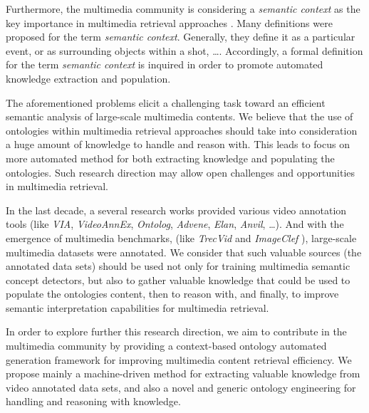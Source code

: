 		Furthermore, the multimedia community is considering a  \emph{semantic context}
		as the key importance in multimedia retrieval approaches 
		\citep{Mylonas2009,Nguyen2010,Elleuch2011,PerpetualCoutinho2012}. 
		Many definitions were proposed for the term \emph{semantic context}. 
		Generally, they define it as a particular event, or as surrounding objects 
		within a shot, \dots. Accordingly, a formal definition for the term \emph{semantic context} 
		is inquired in order to promote automated knowledge extraction and  population. 

		The aforementioned problems elicit a challenging task toward an efficient
		semantic analysis of large-scale multimedia contents. We believe that 
		the use of ontologies within multimedia retrieval approaches should 
		take into consideration a huge amount of knowledge to handle and reason with. 
		This leads to focus on more automated method for both extracting 
		knowledge and populating the ontologies. 
		Such research direction may allow  open challenges and opportunities in multimedia retrieval.


		In the last decade, a several research works provided various video annotation
		tools \citep{Dasiopoulou2011,Ksentini2012} (like  \emph{VIA}, \emph{VideoAnnEx},
		\emph{Ontolog}, \emph{Advene}, \emph{Elan}, \emph{Anvil}, \dots).
		And with the emergence of multimedia benchmarks, (like \emph{TrecVid}
		\citep{Over2013} and \emph{ImageClef} \citep{Thomee2012}), large-scale multimedia
		datasets were annotated.
		We consider that such valuable sources (the annotated data sets) should be used
		not only for training multimedia semantic concept detectors, but also to gather
		valuable knowledge that could be used to populate the ontologies content, then to reason with, 
		and finally, to improve semantic interpretation capabilities for multimedia retrieval.

		In order to explore further this research direction, we aim to contribute in the
		multimedia community by providing a context-based ontology automated generation 
		framework for improving multimedia content retrieval efficiency. We propose mainly 
		a machine-driven method for extracting valuable knowledge from video annotated data sets, 
		and also a novel and generic ontology engineering for handling and reasoning  with knowledge.


